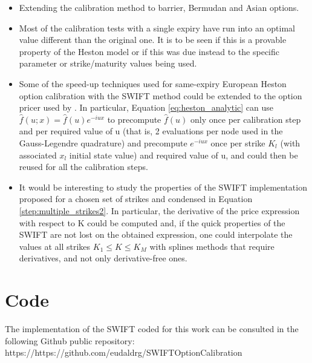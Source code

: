 \documentclass[12,twoside]{mammeTFM}
\theoremstyle{definition}
\theoremstyle{remark}
\begin{document}
\begin{itemize}

\item Extending the calibration method to barrier, Bermudan and Asian options.

\item Most of the calibration tests with a single expiry have run into an optimal value different than the original one. It is to be seen if this is a provable property of the Heston model or if this was due instead to the specific parameter or strike/maturity values being used.

\item Some of the speed-up techniques used for same-expiry European Heston option calibration with the SWIFT method could be extended to the option pricer used by \cite{cui17}. In particular, Equation \ref{eq:heston_analytic} can use $\hat{f}(u; x) = \hat{f}(u) e^{-i u x}$ to precompute $\hat{f}(u)$ only once per calibration step and per required value of u (that is, 2 evaluations per node used in the Gauss-Legendre quadrature) and precompute $e^{-i u x}$ once per strike $K_l$ (with associated $x_l$ initial state value) and required value of u, and could then be reused for all the calibration steps.

\item It would be interesting to study the properties of the SWIFT implementation proposed for a chosen set of strikes and condensed in Equation \ref{step:multiple_strikes2}. In particular, the derivative of the price expression with respect to K could be computed and, if the quick properties of the SWIFT are not lost on the obtained expression, one could interpolate the values at all strikes $K_1 \leq K \leq K_M$ with splines methods that require derivatives, and not only derivative-free ones.

\end{itemize}

\newpage

{}


\appendix
\vfill\newpage 
\section{Code}
The implementation of the SWIFT coded for this work can be consulted in the following Github public repository:
https://https://github.com/eudaldrg/SWIFTOptionCalibration
\end{document}
